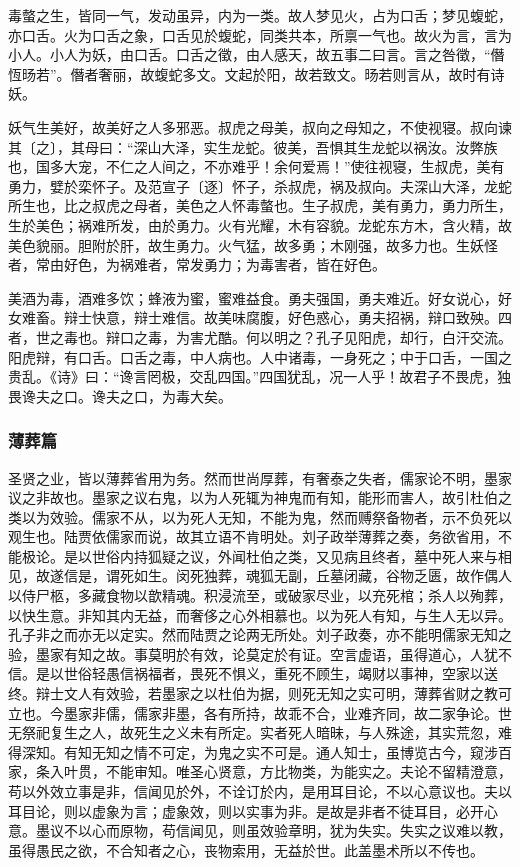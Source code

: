 \documentclass[]{article}
\begin{document}
毒螫之生，皆同一气，发动虽异，内为一类。故人梦见火，占为口舌；梦见蝮蛇，亦口舌。火为口舌之象，口舌见於蝮蛇，同类共本，所禀一气也。故火为言，言为小人。小人为妖，由口舌。口舌之徵，由人感天，故五事二曰言。言之咎徵，``僭恆旸若''。僭者奢丽，故蝮蛇多文。文起於阳，故若致文。旸若则言从，故时有诗妖。

妖气生美好，故美好之人多邪恶。叔虎之母美，叔向之母知之，不使视寝。叔向谏其〔之〕，其母曰：``深山大泽，实生龙蛇。彼美，吾惧其生龙蛇以祸汝。汝弊族也，国多大宠，不仁之人间之，不亦难乎！余何爱焉！''使往视寝，生叔虎，美有勇力，嬖於栾怀子。及范宣子〔逐〕怀子，杀叔虎，祸及叔向。夫深山大泽，龙蛇所生也，比之叔虎之母者，美色之人怀毒螫也。生子叔虎，美有勇力，勇力所生，生於美色；祸难所发，由於勇力。火有光耀，木有容貌。龙蛇东方木，含火精，故美色貌丽。胆附於肝，故生勇力。火气猛，故多勇；木刚强，故多力也。生妖怪者，常由好色，为祸难者，常发勇力；为毒害者，皆在好色。

美酒为毒，酒难多饮；蜂液为蜜，蜜难益食。勇夫强国，勇夫难近。好女说心，好女难畜。辩士快意，辩士难信。故美味腐腹，好色惑心，勇夫招祸，辩口致殃。四者，世之毒也。辩口之毒，为害尤酷。何以明之？孔子见阳虎，却行，白汗交流。阳虎辩，有口舌。口舌之毒，中人病也。人中诸毒，一身死之；中于口舌，一国之贵乱。《诗》曰：``谗言罔极，交乱四国。''四国犹乱，况一人乎！故君子不畏虎，独畏谗夫之口。谗夫之口，为毒大矣。

\hypertarget{header-n824}{%
\subsubsection{薄葬篇}\label{header-n824}}

圣贤之业，皆以薄葬省用为务。然而世尚厚葬，有奢泰之失者，儒家论不明，墨家议之非故也。墨家之议右鬼，以为人死辄为神鬼而有知，能形而害人，故引杜伯之类以为效验。儒家不从，以为死人无知，不能为鬼，然而赙祭备物者，示不负死以观生也。陆贾依儒家而说，故其立语不肯明处。刘子政举薄葬之奏，务欲省用，不能极论。是以世俗内持狐疑之议，外闻杜伯之类，又见病且终者，墓中死人来与相见，故遂信是，谓死如生。闵死独葬，魂狐无副，丘墓闭藏，谷物乏匮，故作偶人以侍尸柩，多藏食物以歆精魂。积浸流至，或破家尽业，以充死棺；杀人以殉葬，以快生意。非知其内无益，而奢侈之心外相慕也。以为死人有知，与生人无以异。孔子非之而亦无以定实。然而陆贾之论两无所处。刘子政奏，亦不能明儒家无知之验，墨家有知之故。事莫明於有效，论莫定於有证。空言虚语，虽得道心，人犹不信。是以世俗轻愚信祸福者，畏死不惧义，重死不顾生，竭财以事神，空家以送终。辩士文人有效验，若墨家之以杜伯为据，则死无知之实可明，薄葬省财之教可立也。今墨家非儒，儒家非墨，各有所持，故乖不合，业难齐同，故二家争论。世无祭祀复生之人，故死生之义未有所定。实者死人暗昧，与人殊途，其实荒忽，难得深知。有知无知之情不可定，为鬼之实不可是。通人知士，虽博览古今，窥涉百家，条入叶贯，不能审知。唯圣心贤意，方比物类，为能实之。夫论不留精澄意，苟以外效立事是非，信闻见於外，不诠订於内，是用耳目论，不以心意议也。夫以耳目论，则以虚象为言；虚象效，则以实事为非。是故是非者不徒耳目，必开心意。墨议不以心而原物，苟信闻见，则虽效验章明，犹为失实。失实之议难以教，虽得愚民之欲，不合知者之心，丧物索用，无益於世。此盖墨术所以不传也。
\end{document}
